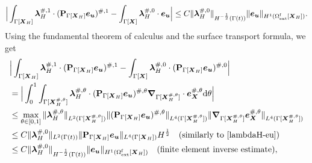 \documentclass[11pt,reqno]{amsart}
\theoremstyle{definition}
\theoremstyle{plain}
\numberwithin{theorem}{section}
\numberwithin{proposition}{section}
\numberwithin{lemma}{section}
\numberwithin{equation}{section}
\newcommand{\bs}[1]{\boldsymbol{#1}}
\newcommand{\uu}[1]  {{\bs{#1}} }
\newcommand{\grad}   { \uu{\nabla}    }
\def\d{\mathrm{d}}
\renewcommand{\(}{\bigl(}
\renewcommand{\)}{\bigr)}
\begin{document}
\begin{equation}\label{lambdaH1-01}
\Big| \int_{\Gamma[\bs X_H]} \bs \lambda_H^{\#,1} \cdot ({\bf P}_{\Gamma[\bs X_H]} {\bs e}_{\bs u} )^{\#,1}
- \int_{\Gamma[\bs X]} \bs \lambda_H^{\#,0} \cdot {\bs e}_{\bs u} \Big| 
\le
C\|{\bs \lambda}_H^{\#,0}\|_{H^{-\frac12}(\Gamma(t))} \| {\bs e}_{\bs u}\|_{H^1(\Omega^{\rm f}_{\rm ext}[\bs  X_H])} .
\end{equation} 
Using the fundamental theorem of calculus and the surface transport formula, we get 
\begin{align}\label{lambdaH1-02}
&\Big| \int_{\Gamma[{\bs X}_H]} {\bs\lambda}_H^{\#,1} \cdot ({\bf P}_{\Gamma[\bs X_H]}{\bs e}_{\bs u})^{\#,1} 
- \int_{\Gamma[\bs X]} \bs \lambda_H^{\#,0} \cdot ({\bf P}_{\Gamma[\bs X_H]}{\bs e}_{\bs u})^{\#,0} \Big|  \notag \\
&=
\Big| \int_0^1 \int_{\Gamma[{\bs X}_H^{\#,\theta}]}{\bs\lambda}_H^{\#,\theta} \cdot ({\bf P}_{\Gamma[\bs X_H]}{\bs e}_{\bs u})^{\#,\theta} \grad_{\Gamma[{\bs X}_H^{\#,\theta}]}\cdot {\bs e}_{\bs X}^{\#,\theta} \d\theta \Big| \notag\\
&\le
\max_{\theta\in[0,1]} \|{\bs\lambda}_H^{\#,\theta}\|_{L^2(\Gamma[{\bs X}_H^{\#,\theta}])}
\|({\bf P}_{\Gamma[\bs X_H]}{\bs e}_{\bs u})^{\#,\theta}\|_{L^4(\Gamma[{\bs X}_H^{\#,\theta}])} 
\|\grad_{\Gamma[{\bs X}_H^{\#,\theta}]}{\bs e}_{\bs X}^{\#,\theta}\|_{L^4(\Gamma[{\bs X}_H^{\#,\theta}])} \notag\\
&\le
C\|{\bs\lambda}_H^{\#,0}\|_{L^2(\Gamma(t))}
\|{\bf P}_{\Gamma[\bs X_H]}{\bs e}_{\bs u}\|_{L^4(\Gamma[{\bs X}_H])} H^{\frac12}
\quad\mbox{(similarly to \eqref{lambdaH-eu})}\notag\\
&\le
C\|{\bs\lambda}_H^{\#,0}\|_{H^{-\frac12}(\Gamma(t))}
\|{\bs e}_{\bs u}\|_{H^1(\Omega^{\rm f}_{\rm ext}[{\bs X}_H])} 
\quad\mbox{(finite element inverse estimate)},
\end{align} 
\end{document}
